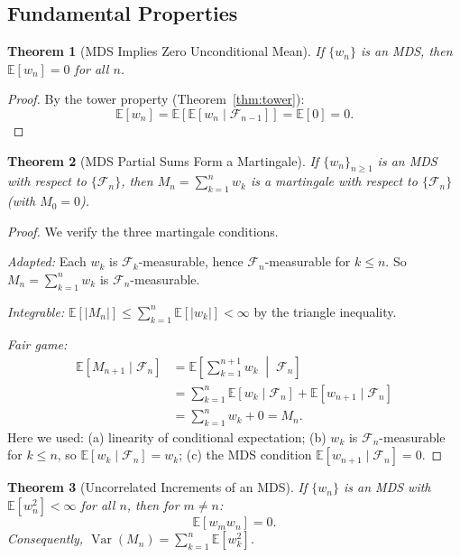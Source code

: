 \documentclass[11pt,a4paper]{article}
\theoremstyle{definition}
\theoremstyle{plain}
\newtheorem{theorem}{Theorem}[section]
\theoremstyle{remark}
\DeclareMathOperator{\Var}{Var}
\newcommand{\E}{\mathbb{E}}
\begin{document}
\subsection{Fundamental Properties}
\label{subsec:mds_props}

\begin{theorem}[MDS Implies Zero Unconditional Mean]
\label{thm:mds_zero_mean}
If $\{w_n\}$ is an MDS, then $\E[w_n] = 0$ for all $n$.
\end{theorem}

\begin{proof}
By the tower property (Theorem~\ref{thm:tower}):
\begin{equation}
    \E[w_n] = \E[\E[w_n \mid \mathcal{F}_{n-1}]] = \E[0] = 0. \label{eq:mds_zero_proof}
\end{equation}
\end{proof}

\begin{theorem}[MDS Partial Sums Form a Martingale]
\label{thm:mds_martingale}
If $\{w_n\}_{n \geq 1}$ is an MDS with respect to $\{\mathcal{F}_n\}$, then $M_n = \sum_{k=1}^n w_k$ is a martingale with respect to $\{\mathcal{F}_n\}$ (with $M_0 = 0$).
\end{theorem}

\begin{proof}
We verify the three martingale conditions.

\textit{Adapted:} Each $w_k$ is $\mathcal{F}_k$-measurable, hence $\mathcal{F}_n$-measurable for $k \leq n$. So $M_n = \sum_{k=1}^n w_k$ is $\mathcal{F}_n$-measurable.

\textit{Integrable:} $\E[|M_n|] \leq \sum_{k=1}^n \E[|w_k|] < \infty$ by the triangle inequality.

\textit{Fair game:}
\begin{align}
    \E[M_{n+1} \mid \mathcal{F}_n]
    &= \E\!\left[\sum_{k=1}^{n+1} w_k \;\middle|\; \mathcal{F}_n\right] \nonumber\\
    &= \sum_{k=1}^n \E[w_k \mid \mathcal{F}_n] + \E[w_{n+1} \mid \mathcal{F}_n] \nonumber\\
    &= \sum_{k=1}^n w_k + 0 = M_n. \label{eq:mds_martingale_proof}
\end{align}
Here we used: (a) linearity of conditional expectation; (b) $w_k$ is $\mathcal{F}_n$-measurable for $k \leq n$, so $\E[w_k \mid \mathcal{F}_n] = w_k$; (c) the MDS condition $\E[w_{n+1} \mid \mathcal{F}_n] = 0$.
\end{proof}

\begin{theorem}[Uncorrelated Increments of an MDS]
\label{thm:mds_uncorrelated}
If $\{w_n\}$ is an MDS with $\E[w_n^2] < \infty$ for all $n$, then for $m \neq n$:
\begin{equation}
    \E[w_m w_n] = 0.
    \label{eq:mds_uncorrelated}
\end{equation}
Consequently, $\Var(M_n) = \sum_{k=1}^n \E[w_k^2]$.
\end{theorem}
\end{document}
